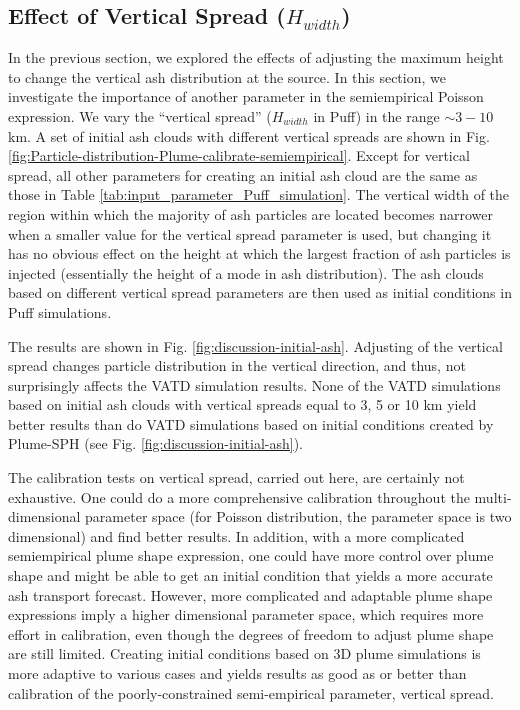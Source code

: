 \documentclass[utf8]{frontiersSCNS} %
\begin{document}
\subsection{Effect of Vertical Spread ($H_{width}$)}
In the previous section, we explored the effects of adjusting the maximum height to change the vertical ash distribution at the source. In this section, we investigate the importance of another parameter in the semiempirical Poisson expression. We vary the ``vertical spread'' ($H_{width}$ in Puff) in the range $\sim 3 - 10$ km. A set of initial ash clouds  with different vertical spreads are shown in Fig. \ref{fig:Particle-distribution-Plume-calibrate-semiempirical}. Except for vertical spread, all other parameters for creating an initial ash cloud are the same as those in Table \ref{tab:input_parameter_Puff_simulation}. The vertical width of the region within which the majority of ash particles are located becomes narrower when a smaller value for the vertical spread parameter is used, but changing it has no obvious effect on the height at which the largest fraction of ash particles is injected (essentially the height of a mode in ash distribution). The ash clouds based on different vertical spread parameters are then used as initial conditions in Puff simulations.

The results are shown in Fig. \ref{fig:discussion-initial-ash}.  Adjusting of the vertical spread changes particle distribution in the vertical direction, and thus, not surprisingly affects the VATD simulation results. None of the VATD simulations based on initial ash clouds with vertical spreads equal to 3, 5 or 10 km yield better results than do VATD simulations based on initial conditions created by Plume-SPH (see Fig. \ref{fig:discussion-initial-ash}).

The calibration tests on vertical spread, carried out here, are certainly not exhaustive. One could do a more comprehensive calibration throughout the multi-dimensional parameter space (for Poisson distribution, the parameter space is two dimensional) and find better results. In addition, with a more complicated semiempirical plume shape expression, one could have more control over plume shape and might be able to get an initial condition that yields a more accurate ash transport forecast. However, more complicated and adaptable plume shape expressions imply a higher dimensional parameter space, which requires more effort in calibration, even though the degrees of freedom to adjust plume shape are still limited.  Creating initial conditions based on 3D plume simulations is more adaptive to various cases and yields results as good as or better than calibration of the poorly-constrained semi-empirical parameter, vertical spread.
\end{document}

